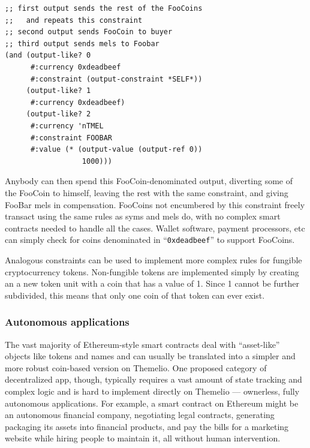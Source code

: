 \documentclass[]{article}
\begin{document}
\begin{verbatim}
;; first output sends the rest of the FooCoins
;;   and repeats this constraint
;; second output sends FooCoin to buyer
;; third output sends mels to Foobar
(and (output-like? 0
      #:currency 0xdeadbeef
      #:constraint (output-constraint *SELF*))
     (output-like? 1
      #:currency 0xdeadbeef)
     (output-like? 2
      #:currency 'nTMEL
      #:constraint FOOBAR
      #:value (* (output-value (output-ref 0))
                  1000)))
\end{verbatim}

Anybody can then spend this FooCoin-denominated output, diverting some
of the FooCoin to himself, leaving the rest with the same constraint,
and giving FooBar mels in compensation. FooCoins not encumbered by this
constraint freely transact using the same rules as syms and mels do,
with no complex smart contracts needed to handle all the cases. Wallet
software, payment processors, etc can simply check for coins denominated
in ``\texttt{0xdeadbeef}'' to support FooCoins.

Analogous constraints can be used to implement more complex rules for
fungible cryptocurrency tokens. Non-fungible tokens are implemented
simply by creating an a new token unit with a coin that has a value of
1. Since 1 cannot be further subdivided, this means that only one coin
of that token can ever exist.

\hypertarget{autonomous-applications}{%
\subsubsection{Autonomous applications}\label{autonomous-applications}}

The vast majority of Ethereum-style smart contracts deal with
``asset-like'' objects like tokens and names and can usually be
translated into a simpler and more robust coin-based version on
Themelio. One proposed category of decentralized app, though, typically
requires a vast amount of state tracking and complex logic and is hard
to implement directly on Themelio --- ownerless, fully autonomous
applications. For example, a smart contract on Ethereum might be an
autonomous financial company, negotiating legal contracts, generating
packaging its assets into financial products, and pay the bills for a
marketing website while hiring people to maintain it, all without human
intervention.
\end{document}
